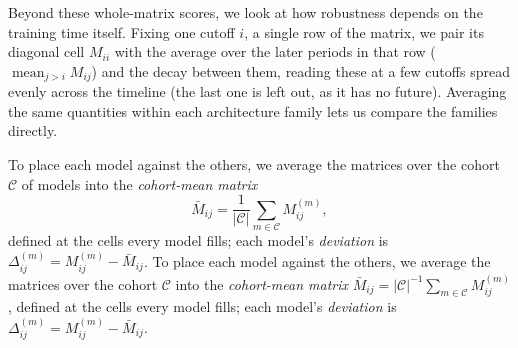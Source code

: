 Beyond these whole-matrix scores, we look at how robustness depends on the training time itself. Fixing one cutoff $i$, a single row of the matrix, we pair its diagonal cell $M_{ii}$ with the average over the later periods in that row ($\operatorname{mean}_{j>i} M_{ij}$) and the decay between them, reading these at a few cutoffs spread evenly across the timeline (the last one is left out, as it has no future). Averaging the same quantities within each architecture family lets us compare the families directly.

\ifverbosemath
To place each model against the others, we average the matrices over the cohort $\mathcal{C}$ of models into the \emph{cohort-mean matrix}
\begin{equation}
    \bar{M}_{ij} = \frac{1}{|\mathcal{C}|}\sum_{m \in \mathcal{C}} M^{(m)}_{ij},
    \label{eq:cohort_mean}
\end{equation}
defined at the cells every model fills; each model's \emph{deviation} is $\Delta^{(m)}_{ij} = M^{(m)}_{ij} - \bar{M}_{ij}$.
\else
To place each model against the others, we average the matrices over the cohort $\mathcal{C}$ into the \emph{cohort-mean matrix} $\bar{M}_{ij} = |\mathcal{C}|^{-1}\sum_{m \in \mathcal{C}} M^{(m)}_{ij}$, defined at the cells every model fills; each model's \emph{deviation} is $\Delta^{(m)}_{ij} = M^{(m)}_{ij} - \bar{M}_{ij}$.
\fi
